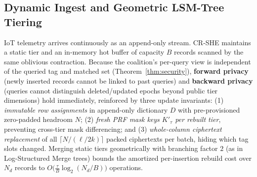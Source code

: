 \documentclass[11pt,a4paper]{article}
\begin{document}
\subsection{Dynamic Ingest and Geometric LSM-Tree Tiering}\label{sec:dynamic}

IoT telemetry arrives continuously as an append-only stream. CR-SHE maintains a static tier and an in-memory hot buffer of capacity $B$ records scanned by the same oblivious contraction. Because the coalition's per-query view is independent of the queried tag and matched set (Theorem~\ref{thm:security}), \textbf{forward privacy} (newly inserted records cannot be linked to past queries) and \textbf{backward privacy} (queries cannot distinguish deleted/updated epochs beyond public tier dimensions) hold immediately, reinforced by three update invariants: (1) \textit{immutable row assignments} in append-only dictionary $D$ with pre-provisioned zero-padded headroom $N$; (2) \textit{fresh PRF mask keys $K'_\tau$ per rebuilt tier}, preventing cross-tier mask differencing; and (3) \textit{whole-column ciphertext replacement} of all $\lceil N/(\ell/2k)\rceil$ packed ciphertexts per batch, hiding which tag slots changed. Merging static tiers geometrically with branching factor $2$ (as in Log-Structured Merge trees) bounds the amortized per-insertion rebuild cost over $N_d$ records to $O\big(\frac{\tau}{B}\log_2(N_d/B)\big)$ operations.
\end{document}
